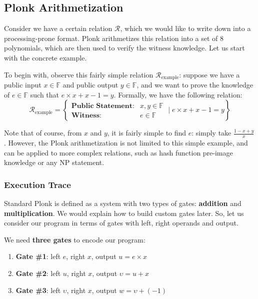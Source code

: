 \documentclass[../lecture-notes.tex]{subfiles}
\begin{document}
\subsection{Plonk Arithmetization}

Consider we have a certain relation $\mathcal{R}$, which we would like to write
down into a processing-prone format. Plonk arithmetizes this relation into a set
of 8 polynomials, which are then used to verify the witness knowledge. Let us 
start with the concrete example.

\begin{example}
To begin with, observe this fairly simple relation
$\mathcal{R}_{\text{example}}$: suppose we have a public input $x \in
\mathbb{F}$ and public output $y \in \mathbb{F}$, and we want to prove the knowledge of $e \in
\mathbb{F}$ such that $e \times x + x - 1 = y$. Formally, we have the following relation:
\begin{equation*}
    \mathcal{R}_{\text{example}} = \left\{ \begin{matrix}
        \textbf{Public Statement:} & x, y \in \mathbb{F} \\
        \textbf{Witness}: & e \in \mathbb{F}
    \end{matrix} \; \Big| \; e \times x + x - 1 = y \right\}
\end{equation*}

\end{example}

\begin{remark}
    Note that of course, from $x$ and $y$, it is fairly simple to find $e$: simply take $\frac{1 - x + y}{x}$. However, the Plonk arithmetization 
    is not limited to this simple example, and can be applied to more complex relations, such as hash function pre-image knowledge or any NP statement.
\end{remark}

\subsubsection{Execution Trace}

Standard Plonk is defined as a system with two types of gates: \textbf{addition}
and \textbf{multiplication}. We would explain how to build custom gates later.
So, let us consider our program in terms of gates with left, right operands and
output. 

\begin{example}
    We need \textbf{three gates} to encode our program:
    \begin{enumerate}
        \item \textbf{Gate \#1}: left $e$, right $x$, output \(u = e \times x\)
        \item \textbf{Gate \#2}: left $u$, right $x$, output \(\upsilon = u + x\)
        \item \textbf{Gate \#3}: left $\upsilon$, right $x$, output \(w = \upsilon + (-1)\)
    \end{enumerate}
\end{example}
\end{document}

